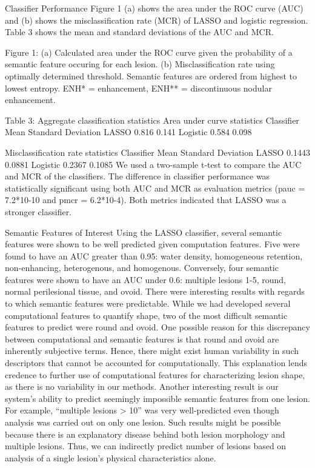 Classifier Performance
Figure 1 (a) shows the area under the ROC curve (AUC) and (b) shows the misclassification rate (MCR) of LASSO and logistic regression. Table 3 shows the mean and standard deviations of the AUC and MCR.
 
Figure 1: (a) Calculated area under the ROC curve given the probability of a semantic feature occuring for each lesion. (b) Misclassification rate using optimally determined threshold. Semantic features are ordered from highest to lowest entropy. ENH* = enhancement, ENH** = discontinuous nodular enhancement.
 

Table 3: Aggregate classification statistics
Area under curve statistics
Classifier	Mean	Standard Deviation
LASSO	0.816	0.141
Logistic	0.584	0.098
		
Misclassification rate statistics
Classifier	Mean	Standard Deviation
LASSO	0.1443	0.0881
Logistic	0.2367	0.1085
We used a two-sample t-test to compare the AUC and MCR of the classifiers. The difference in classifier performance was statistically significant using both AUC and MCR as evaluation metrics (pauc = 7.2*10-10 and pmcr = 6.2*10-4). Both metrics indicated that LASSO was a stronger classifier.



Semantic Features of Interest
Using the LASSO classifier, several semantic features were shown to be well predicted given computation features. Five were found to have an AUC greater than 0.95: water density, homogeneous retention, non-enhancing, heterogenous, and homogenous.
Conversely, four semantic features were shown to have an AUC under 0.6: multiple lesions 1-5, round, normal perilesional tissue, and ovoid.
There were interesting results with regards to which semantic features were predictable. While we had developed several computational features to quantify shape, two of the most difficult semantic features to predict were round and ovoid. One possible reason for this discrepancy between computational and semantic features is that round and ovoid are inherently subjective terms. Hence, there might exist human variability in such descriptors that cannot be accounted for computationally. This explanation lends credence to further use of computational features for characterizing lesion shape, as there is no variability in our methods.
Another interesting result is our system’s ability to predict seemingly impossible semantic features from one lesion. For example, “multiple lesions > 10” was very well-predicted even though analysis was carried out on only one lesion. Such results might be possible because there is an explanatory disease behind both lesion morphology and multiple lesions. Thus, we can indirectly predict number of lesions based on analysis of a single lesion’s physical characteristics alone.

